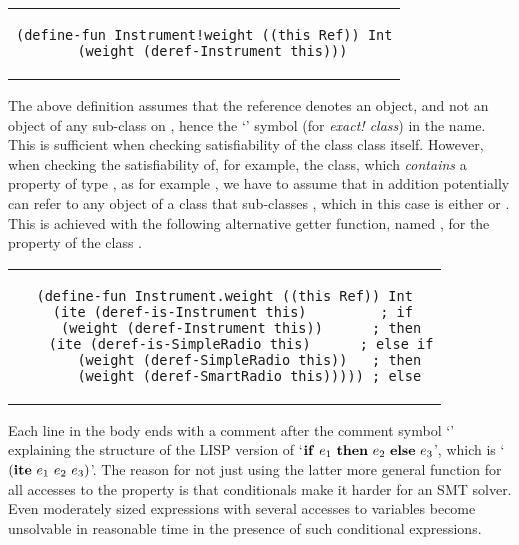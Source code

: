 \begin{center}
\begin{tabular}{c}
\begin{lstlisting}
(define-fun Instrument!weight ((this Ref)) Int
  (weight (deref-Instrument this)))
\end{lstlisting}
\end{tabular}
\end{center}

\noindent The above definition assumes that the  reference
denotes an  object, and not an object of any
sub-class on , hence the `\code{!}' symbol (for {\em
  exact!  class}) in the name.  This is sufficient when checking
satisfiability of the class  class itself. However,
when checking the satisfiability of, for example, the
 class, which {\em contains} a property of type
, as for example , we have
to assume that  in addition potentially can refer to any
object of a class that sub-classes , which in this
case is either  or . This is
achieved with the following alternative getter function, named
, for the  property of the class
.

\begin{center}
\begin{tabular}{c}
\begin{lstlisting}
(define-fun Instrument.weight ((this Ref)) Int
  (ite (deref-is-Instrument this)         ; if
    (weight (deref-Instrument this))      ; then
    (ite (deref-is-SimpleRadio this)      ; else if
      (weight (deref-SimpleRadio this))   ; then
      (weight (deref-SmartRadio this))))) ; else
\end{lstlisting}
\end{tabular}
\end{center}

\noindent Each line in the body ends with a comment after the comment
symbol `\code{;}' explaining the structure of the LISP version of
`${\bf if}\ e_1\ {\bf then}\ e_2\ {\bf else}\ e_3$', which is `$({\bf
  ite}\ e_1\ e_2\ e_3)$'. The reason for not just using the latter
more general function  for all accesses to the
 property is that conditionals make it harder for an SMT
solver. Even moderately sized expressions with several accesses to
variables become unsolvable in reasonable time in the presence of such
conditional expressions.

